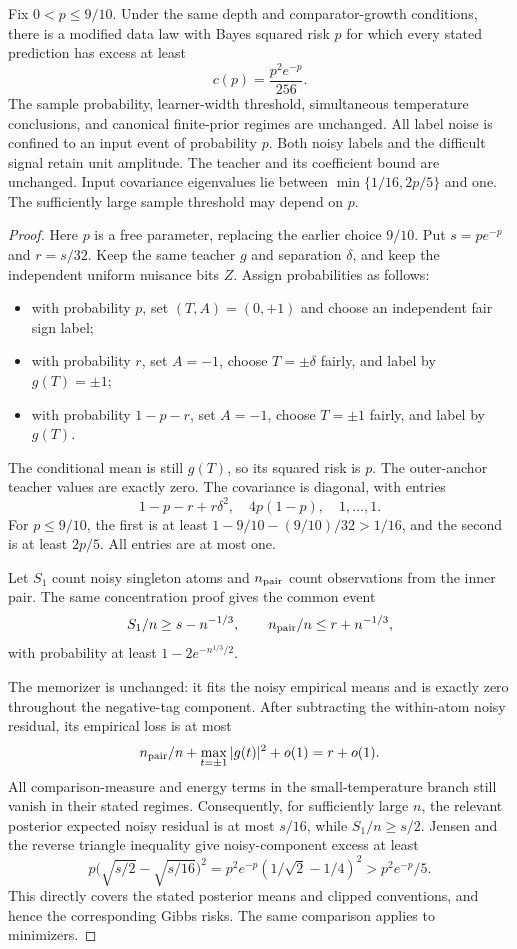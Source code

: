 \begin{corollary}
\label{cor:localized-noise}
Fix $0<p\le9/10$. Under the same depth and comparator-growth conditions, there is a modified data law with Bayes squared risk $p$ for which every stated prediction has excess at least
\[
 c(p)=\frac{p^2e^{-p}}{256}.
\]
The sample probability, learner-width threshold, simultaneous temperature conclusions, and canonical finite-prior regimes are unchanged. All label noise is confined to an input event of probability $p$. Both noisy labels and the difficult signal retain unit amplitude. The teacher and its coefficient bound are unchanged. Input covariance eigenvalues lie between $\min\{1/16,2p/5\}$ and one. The sufficiently large sample threshold may depend on $p$.
\end{corollary}
\begin{proof}
Here $p$ is a free parameter, replacing the earlier choice $9/10$. Put $s=pe^{-p}$ and $r=s/32$. Keep the same teacher $g$ and separation $\delta$, and keep the independent uniform nuisance bits $Z$. Assign probabilities as follows:
\begin{itemize}
\item with probability $p$, set $(T,A)=(0,+1)$ and choose an independent fair sign label;
\item with probability $r$, set $A=-1$, choose $T=\pm\delta$ fairly, and label by $g(T)=\pm1$;
\item with probability $1-p-r$, set $A=-1$, choose $T=\pm1$ fairly, and label by $g(T)$.
\end{itemize}
The conditional mean is still $g(T)$, so its squared risk is $p$. The outer-anchor teacher values are exactly zero. The covariance is diagonal, with entries
\[
 1-p-r+r\delta^2,\quad4p(1-p),\quad1,\ldots,1.
\]
For $p\le9/10$, the first is at least $1-9/10-(9/10)/32>1/16$, and the second is at least $2p/5$. All entries are at most one.

Let $S_1$ count noisy singleton atoms and $n_{\rm pair}$ count observations from the inner pair. The same concentration proof gives the common event
\[
 S_1/n\ge s-n^{-1/3},\qquad
 n_{\rm pair}/n\le r+n^{-1/3},
\]
with probability at least $1-2e^{-n^{1/3}/2}$.

The memorizer is unchanged: it fits the noisy empirical means and is exactly zero throughout the negative-tag component. After subtracting the within-atom noisy residual, its empirical loss is at most
\[
 n_{\rm pair}/n+\max_{t=\pm1}|g(t)|^2+o(1)=r+o(1).
\]
All comparison-measure and energy terms in the small-temperature branch still vanish in their stated regimes. Consequently, for sufficiently large $n$, the relevant posterior expected noisy residual is at most $s/16$, while $S_1/n\ge s/2$. Jensen and the reverse triangle inequality give noisy-component excess at least
\[
 p\bigl(\sqrt{s/2}-\sqrt{s/16}\bigr)^2
 =p^2e^{-p}(1/\sqrt2-1/4)^2>p^2e^{-p}/5.
\]
This directly covers the stated posterior means and clipped conventions, and hence the corresponding Gibbs risks. The same comparison applies to minimizers.


\end{proof}
